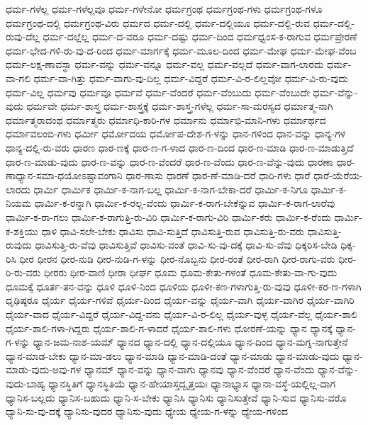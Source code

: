 {ಧರ್ಮ-ಗಳೆಲ್ಲ
ಧರ್ಮ-ಗಳೆಲ್ಲವೂ
ಧರ್ಮ-ಗಳೇನೋ
ಧರ್ಮಗ್ರಂಥ
ಧರ್ಮಗ್ರಂಥ-ಗಳು
ಧರ್ಮಗ್ರಂಥ-ಗಳೂ
ಧರ್ಮಗ್ರಂಥ-ದಲ್ಲಿ
ಧರ್ಮಗ್ರಂಥ-ವಿರು
ಧರ್ಮದ
ಧರ್ಮ-ದಲ್ಲಿ
ಧರ್ಮ-ದಲ್ಲಿಯೂ
ಧರ್ಮ-ದಲ್ಲಿ-ರುವ
ಧರ್ಮ-ದಲ್ಲಿ-ರುವು-ದೆಲ್ಲ
ಧರ್ಮ-ದಲ್ಲೆಲ್ಲ
ಧರ್ಮ-ದ-ವರೂ
ಧರ್ಮ-ದಷ್ಟು
ಧರ್ಮ-ದಿಂದ
ಧರ್ಮಧ್ವಂಸ-ಕ-ರಾಗುವ
ಧರ್ಮಪ್ರೇರಣೆ
ಧರ್ಮ-ಭೇದ-ಗಳಿ-ರು-ವು-ದ-ರಿಂದ
ಧರ್ಮ-ಮಾರ್ಗಕ್ಕೆ
ಧರ್ಮ-ಮೂಲ-ದಿಂದ
ಧರ್ಮ-ಮೇಘ
ಧರ್ಮ-ಮೇಘ-ವೆಂಬ
ಧರ್ಮ-ಲಕ್ಷ-ಣಾವಸ್ಥಾ
ಧರ್ಮ-ವನ್ನು
ಧರ್ಮ-ವನ್ನೂ
ಧರ್ಮ-ವಲ್ಲ
ಧರ್ಮ-ವಲ್ಲದೆ
ಧರ್ಮ-ವಾಗ-ಲಾರದು
ಧರ್ಮ-ವಾ-ಗಲಿ
ಧರ್ಮ-ವಾ-ಗಿತ್ತು
ಧರ್ಮ-ವಾಗು-ವು-ದಿಲ್ಲ
ಧರ್ಮ-ವಿದ್ದರೆ
ಧರ್ಮ-ವಿ-ರ-ಲಿಲ್ಲವೋ
ಧರ್ಮ-ವಿ-ರು-ವುದು
ಧರ್ಮ-ವಿಲ್ಲ
ಧರ್ಮವು
ಧರ್ಮವೂ
ಧರ್ಮವೆ
ಧರ್ಮ-ವೆಂದರೆ
ಧರ್ಮ-ವೆಂಬುದು
ಧರ್ಮ-ವೆಂಬುದೇ
ಧರ್ಮ-ವೆನ್ನು-ವುದು
ಧರ್ಮವೇ
ಧರ್ಮ-ಶಾಸ್ತ್ರ
ಧರ್ಮ-ಶಾಸ್ತ್ರಕ್ಕೆ
ಧರ್ಮ-ಶಾಸ್ತ್ರ-ಗಳೆಲ್ಲ
ಧರ್ಮ-ಸಾ-ಮರಸ್ಯದ
ಧರ್ಮಾತ್ಮ-ನಾಗಿ
ಧರ್ಮಾತ್ಮರಾದಂಥ
ಧರ್ಮಾತ್ಮರು
ಧರ್ಮಾಧಿ-ಕಾರಿ-ಗಳ
ಧರ್ಮಾನು
ಧರ್ಮಾಭಿ-ಮಾನಿ-ಗಳು
ಧರ್ಮಾರ್ಥದ
ಧರ್ಮಾವಲಂಬಿ-ಗಳು
ಧರ್ಮೀ
ಧರ್ಮೋದಯ
ಧರ್ಮೋಪ-ದೇಶ-ಗ-ಳನ್ನು
ಧಾನ-ಗಳಿಂದ
ಧಾನ-ವನ್ನು
ಧಾನ್ಯ-ಗಳ
ಧಾನ್ಯ-ದಲ್ಲಿ-ರು-ವರು
ಧಾರಣ
ಧಾರ-ಣಕ್ಕೆ
ಧಾರ-ಣ-ಗ-ಳಾದ
ಧಾರ-ಣ-ದಿಂದ
ಧಾರ-ಣ-ಮಾಡಿ
ಧಾರ-ಣ-ಮಾಡುತ್ತಿದೆ
ಧಾರ-ಣ-ಮಾಡು-ವುದು
ಧಾರ-ಣ-ವನ್ನು
ಧಾರ-ಣ-ವೆಂದರೆ
ಧಾರ-ಣ-ವೆಂದು
ಧಾರ-ಣ-ವೆನ್ನು-ವುದು
ಧಾರಣಾ
ಧಾರ-ಣಾಧ್ಯಾನ-ಸಮಾ-ಧಯೋಽಷ್ಟಾವಂಗಾನಿ
ಧಾರ-ಣಾಸು
ಧಾರಣೆ
ಧಾರ-ಣೆ-ಮಾಡಿ-ದರೆ
ಧಾರಿ-ಗಳು
ಧಾರೆ
ಧಾರೆ-ಯೆರೆಯ-ಲಾರದು
ಧಾರ್ಮಿ
ಧಾರ್ಮಿಕ
ಧಾರ್ಮಿ-ಕ-ನಾಗ-ಬಲ್ಲ
ಧಾರ್ಮಿ-ಕ-ನಾಗ-ಬೇಕಾ-ದರೆ
ಧಾರ್ಮಿ-ಕ-ನಿಗೂ
ಧಾರ್ಮಿ-ಕ-ನಿಯಮ
ಧಾರ್ಮಿ-ಕ-ರನ್ನಾಗಿ
ಧಾರ್ಮಿ-ಕ-ರಲ್ಲ-ವೆಂದು
ಧಾರ್ಮಿ-ಕ-ರಾಗ-ಬೇಕೆನ್ನುವ
ಧಾರ್ಮಿ-ಕ-ರಾಗ-ಲಾರೆವು
ಧಾರ್ಮಿ-ಕ-ರಾ-ಗಲು
ಧಾರ್ಮಿ-ಕ-ರಾಗುತ್ತಿ-ರು-ವಿರಿ
ಧಾರ್ಮಿ-ಕ-ರಾಗು-ವಿರಿ
ಧಾರ್ಮಿ-ಕರು
ಧಾರ್ಮಿ-ಕ-ರೆಂದು
ಧಾರ್ಮಿ-ಕ-ಶಕ್ತಿಯು
ಧಾಳಿ
ಧಾವಿ-ಸಲೇ-ಬೇಕು
ಧಾವಿಸು
ಧಾವಿ-ಸುತ್ತಿದೆ
ಧಾವಿಸುತ್ತಿ-ರುವ
ಧಾವಿಸುತ್ತಿ-ರು-ವರು
ಧಾವಿಸುತ್ತಿ-ರುವುದು
ಧಾವಿಸುತ್ತಿ-ರು-ವೆವು
ಧಾವಿಸುತ್ತಿವೆ
ಧಾವಿಸು-ವಂತೆ
ಧಾವಿ-ಸು-ವು-ದಕ್ಕೆ
ಧಾವಿ-ಸು-ವೆವು
ಧಿಕ್ಕರಿಸ-ಬೇಡಿ
ಧಿಕ್ಕ-ರಿಸಿ
ಧೀರ
ಧೀರನ
ಧೀರ-ನುಡಿ
ಧೀರ-ನುಡಿ-ಗ-ಳನ್ನು
ಧೀರ-ನೊಬ್ಬನು
ಧೀರ-ರಂತೆ
ಧೀರ-ರಾಗಿ
ಧೀರ-ರಾಗು-ವರು
ಧೀರ-ರಿ-ರು-ವರು
ಧೀರರು
ಧೀರ-ವಾಣಿ
ಧೀರಾ
ಧೀರ್ಘ
ಧೂಮ
ಧೂಮ-ಕೇತು-ಗಳಂತೆ
ಧೂಮ-ಕೇತು-ವಾ-ಗು-ವುದು
ಧೂಮಕ್ಕೆ
ಧೂರ್ತ-ತನ-ವನ್ನು
ಧೂಳಿ
ಧೂಳಿ-ನಿಂದ
ಧೂಳಿಯ
ಧೂಳೀ-ಕಣ-ಗಳಾಗುತ್ತಿ-ರು-ವುವು
ಧೂಳೀ-ಕರ-ಣ-ಗಳಾಗಿ
ಧೃಢಿಷ್ಠರೂ
ಧೈರ್ಯ
ಧೈರ್ಯ-ಗಳಿವೆ
ಧೈರ್ಯ-ದಿಂದ
ಧೈರ್ಯ-ವನ್ನು
ಧೈರ್ಯ-ವಾಗಿ
ಧೈರ್ಯ-ವಾಗಿರ
ಧೈರ್ಯ-ವಾಗಿರಿ
ಧೈರ್ಯ-ವಾದ
ಧೈರ್ಯ-ವಿದ್ದರೆ
ಧೈರ್ಯ-ವಿದ್ದ-ವನು
ಧೈರ್ಯ-ವಿ-ರ-ಲಿಲ್ಲ
ಧೈರ್ಯ-ವುಳ್ಳ
ಧೈರ್ಯ-ವೆಲ್ಲ
ಧೈರ್ಯ-ಶಾಲಿ
ಧೈರ್ಯ-ಶಾಲಿ-ಗಳಾ-ಗಿದ್ದರು
ಧೈರ್ಯ-ಶಾಲಿ-ಗ-ಳಾದರೆ
ಧೈರ್ಯ-ಶಾಲಿ-ಗಳು
ಧೋರಣೆ-ಯನ್ನು
ಧ್ಯಾನ
ಧ್ಯಾನಕ್ಕೆ
ಧ್ಯಾನ-ಗ-ಳನ್ನು
ಧ್ಯಾನ-ಜಮ-ನಾಶ-ಯಮ್
ಧ್ಯಾನದ
ಧ್ಯಾನ-ದಲ್ಲಿ
ಧ್ಯಾನ-ದಲ್ಲಿಯೂ
ಧ್ಯಾನ-ದಿಂದ
ಧ್ಯಾನ-ಮಗ್ನ-ನಾಗುತ್ತೇನೆ
ಧ್ಯಾನ-ಮಾಡ-ಬೇಕು
ಧ್ಯಾನ-ಮಾ-ಡಲು
ಧ್ಯಾನ-ಮಾಡಿ
ಧ್ಯಾನ-ಮಾಡಿ-ದಂತೆ
ಧ್ಯಾನ-ಮಾಡು
ಧ್ಯಾನ-ಮಾಡು-ವುದು
ಧ್ಯಾನ-ಮಾಡು-ವುದು-ಅವು-ಗಳ
ಧ್ಯಾನಮ್
ಧ್ಯಾನ-ವನ್ನು
ಧ್ಯಾನ-ವಾಗು
ಧ್ಯಾನವು
ಧ್ಯಾನ-ವೆಂದರೆ
ಧ್ಯಾನ-ವೆಂದು
ಧ್ಯಾನ-ವೆನ್ನು-ವುದು-ಬಾಹ್ಯ
ಧ್ಯಾನಸ್ಥಿತಿಗೆ
ಧ್ಯಾನಸ್ಥಿತಿಯೆ
ಧ್ಯಾನ-ಹೇಯಾಸ್ತದ್ವೃತ್ತಯಃ
ಧ್ಯಾನಾಭ್ಯಾಸ
ಧ್ಯಾನಾ-ವಸ್ಥೆ-ಯಲ್ಲಿಲ್ಲ-ದಾಗ
ಧ್ಯಾನಿಸ-ಬಲ್ಲದು
ಧ್ಯಾನಿಸ-ಬಹುದು
ಧ್ಯಾನಿ-ಸ-ಬೇಕು
ಧ್ಯಾನಿಸಿ
ಧ್ಯಾನಿಸು
ಧ್ಯಾನಿಸುತ್ತೇವೆ
ಧ್ಯಾನಿ-ಸುವ
ಧ್ಯಾನಿಸು-ವರೊ
ಧ್ಯಾನಿ-ಸು-ವು-ದಕ್ಕೆ
ಧ್ಯಾನಿಸು-ವುದರ
ಧ್ಯಾನಿಸು-ವುದು
ಧ್ಯೇಯ
ಧ್ಯೇಯ-ಗ-ಳನ್ನು
ಧ್ಯೇಯ-ಗಳಿಂದ
}
